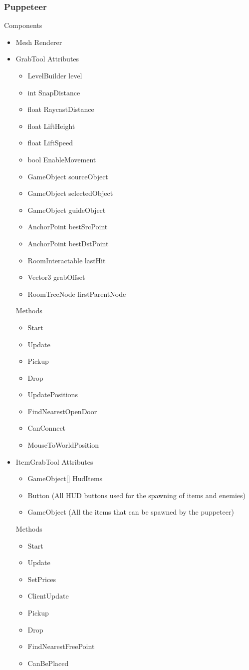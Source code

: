 \documentclass[11pt]{article}
\begin{document}
\subsubsection{Puppeteer}
Components
\begin{itemize}
	\item Mesh Renderer
	\item GrabTool
	\newline Attributes
	\begin{itemize}
		\item LevelBuilder level
		\item int SnapDistance
		\item float RaycastDistance
		\item float LiftHeight
		\item float LiftSpeed
		\item bool EnableMovement
		\item GameObject sourceObject
		\item GameObject selectedObject
		\item GameObject guideObject
		\item AnchorPoint bestSrcPoint
		\item AnchorPoint bestDstPoint
		\item RoomInteractable lastHit
		\item Vector3 grabOffset
		\item RoomTreeNode firstParentNode
	\end{itemize}
	Methods
	\begin{itemize}
		\item Start
		\item Update
		\item Pickup
		\item Drop
		\item UpdatePositions
		\item FindNearestOpenDoor
		\item CanConnect
		\item MouseToWorldPosition
	\end{itemize}
\newpage
	\item ItemGrabTool
	\newline Attributes
	\begin{itemize}
		\item GameObject[] HudItems
		\item Button (All HUD buttons used for the spawning of items and enemies)
		\item GameObject (All the items that can be spawned by the puppeteer)
	\end{itemize}
	Methods
	\begin{itemize}
		\item Start
		\item Update
		\item SetPrices
		\item ClientUpdate
		\item Pickup
		\item Drop
		\item FindNearestFreePoint
		\item CanBePlaced
	\end{itemize}
\end{itemize}
\end{document}
